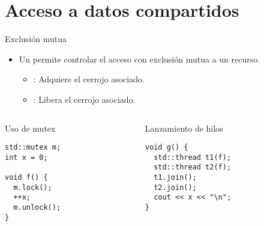 \section{Acceso a datos compartidos}

\begin{frame}[fragile]{Exclusión mutua}
\begin{itemize}
  \item Un  permite controlar el acceso con exclusión mutua a un recurso.

    \begin{itemize}
      \item {}: Adquiere el cerrojo asociado.
      \item {}: Libera el cerrojo asociado.
    \end{itemize}
\end{itemize}

\begin{columns}[T]
\begin{column}{.5\textwidth}
\begin{block}{Uso de mutex}
\begin{lstlisting}
std::mutex m;
int x = 0;

void f() {
  m.lock();
  ++x;
  m.unlock();
}
\end{lstlisting}
\end{block}
\end{column}

\begin{column}{.5\textwidth}
\begin{block}{Lanzamiento de hilos}
\begin{lstlisting}
void g() {
  std::thread t1(f); 
  std::thread t2(f);
  t1.join(); 
  t2.join();
  cout << x << "\n";
}
\end{lstlisting}
\end{block}
\end{column}
\end{columns}

\end{frame}

